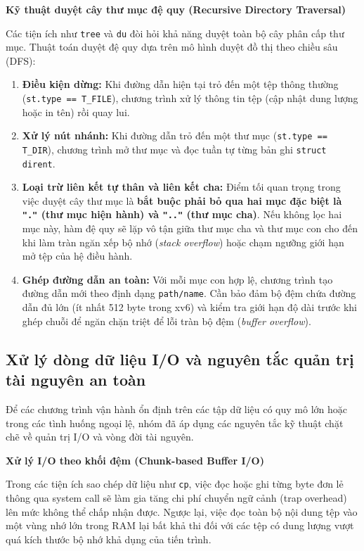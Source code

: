 \documentclass[12pt,a4paper]{article}
\begin{document}
\textbf{Kỹ thuật duyệt cây thư mục đệ quy (Recursive Directory Traversal)}

Các tiện ích như \texttt{tree} và \texttt{du} đòi hỏi khả năng duyệt toàn bộ cây phân cấp thư mục. Thuật toán duyệt đệ quy dựa trên mô hình duyệt đồ thị theo chiều sâu (DFS):
\begin{enumerate}
  \item \textbf{Điều kiện dừng:} Khi đường dẫn hiện tại trỏ đến một tệp thông thường (\texttt{st.type == T\_FILE}), chương trình xử lý thông tin tệp (cập nhật dung lượng hoặc in tên) rồi quay lui.
  \item \textbf{Xử lý nút nhánh:} Khi đường dẫn trỏ đến một thư mục (\texttt{st.type == T\_DIR}), chương trình mở thư mục và đọc tuần tự từng bản ghi \texttt{struct dirent}.
  \item \textbf{Loại trừ liên kết tự thân và liên kết cha:} Điểm tối quan trọng trong việc duyệt cây thư mục là \textbf{bắt buộc phải bỏ qua hai mục đặc biệt là \texttt{"."} (thư mục hiện hành) và \texttt{".."} (thư mục cha)}. Nếu không lọc hai mục này, hàm đệ quy sẽ lặp vô tận giữa thư mục cha và thư mục con cho đến khi làm tràn ngăn xếp bộ nhớ (\textit{stack overflow}) hoặc chạm ngưỡng giới hạn mở tệp của hệ điều hành.
  \item \textbf{Ghép đường dẫn an toàn:} Với mỗi mục con hợp lệ, chương trình tạo đường dẫn mới theo định dạng \texttt{path/name}. Cần bảo đảm bộ đệm chứa đường dẫn đủ lớn (ít nhất 512 byte trong xv6) và kiểm tra giới hạn độ dài trước khi ghép chuỗi để ngăn chặn triệt để lỗi tràn bộ đệm (\textit{buffer overflow}).
\end{enumerate}

\subsection{Xử lý dòng dữ liệu I/O và nguyên tắc quản trị tài nguyên an toàn}

Để các chương trình vận hành ổn định trên các tập dữ liệu có quy mô lớn hoặc trong các tình huống ngoại lệ, nhóm đã áp dụng các nguyên tắc kỹ thuật chặt chẽ về quản trị I/O và vòng đời tài nguyên.

\textbf{Xử lý I/O theo khối đệm (Chunk-based Buffer I/O)}

Trong các tiện ích sao chép dữ liệu như \texttt{cp}, việc đọc hoặc ghi từng byte đơn lẻ thông qua system call sẽ làm gia tăng chi phí chuyển ngữ cảnh (trap overhead) lên mức không thể chấp nhận được. Ngược lại, việc đọc toàn bộ nội dung tệp vào một vùng nhớ lớn trong RAM lại bất khả thi đối với các tệp có dung lượng vượt quá kích thước bộ nhớ khả dụng của tiến trình.
\end{document}
